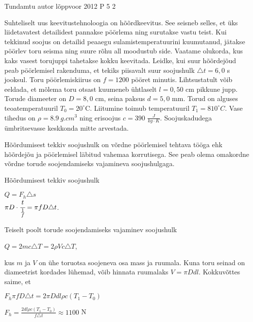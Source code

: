 {Tundamtu autor} %
{lõppvoor} %
{2012} %
{P 5} %
{2} %
{

\ifStatement
Suhteliselt uus keevitustehnoloogia on hõõrdkeevitus. See seisneb selles, et üks liidetavatest detailidest pannakse pöörlema ning surutakse vastu teist. Kui tekkinud soojus on detailid peaaegu sulamistemperatuurini kuumutanud, jätakse pöörlev toru seisma ning suure rõhu all moodustub side. Vaatame olukorda, kus kaks vasest torujuppi tahetakse kokku keevitada. Leidke, kui suur hõõrdejõud peab pöörlemisel rakenduma, et tekiks piisavalt suur soojushulk $\triangle t = 6,0$ s jooksul. Toru pöörlemiskiirus on $f = 1200$ pööret minutis. Lihtsustatult võib eeldada, et mõlema toru otsast kuumeneb ühtlaselt $l = 0,50$ cm pikkune jupp. Torude diameeter on $D = 8,0$ cm, seina paksus $d = 5,0$ mm. Torud on alguses teoatemperatuuril $T_0 = 20^{\circ}$C. Liitumine toimub temperatuuril $T_1 = 810^{\circ}C$. Vase tihedus on $\rho = \SI{8.9}{g.cm^3}$ ning erisoojus $c = 390$ $\frac{J}{kg \cdot K}$. Soojuskadudega ümbritsevasse keskkonda mitte arvestada. 
\fi

\ifHint
Hõõrdumisest tekkiv soojushulk on võrdne pöörlemisel tehtava tööga ehk hõõrdejõu ja pöörlemisel läbitud vahemaa korrutisega. See peab olema omakordne võrdne torude soojendamiseks vajamineva soojushulgaga.
\fi

\ifSolution
Hõõrdumisest tekkiv soojushulk
\begin{center}
$Q = F_h \triangle s$ \\
$\pi D \cdot \cfrac{t}{\frac{1}{f}} = \pi f D \triangle t$.
\end{center}
Teiselt poolt torude soojendamiseks vajaminev soojushulk
\begin{center}
$Q = 2 m c \triangle T = 2 \rho V c \triangle T$,
\end{center}
kus $m$ ja $V$ on ühe toruotsa soojeneva osa mass ja ruumala. Kuna toru seinad on diameetrist kordades lühemad, võib hinnata ruumalaks $V = \pi D dl$. Kokkuvõttes saime, et 
\begin{center}
$F_h \pi f D \triangle t = 2 \pi D d l \rho c (T_1 - T_0)$
\end{center}
\begin{center}
$F_h = \frac{2 d l \rho c (T_1 - T_0)}{f \triangle t} \approx 1100$ N
\end{center}
\fi
}